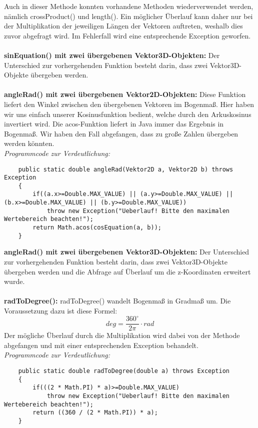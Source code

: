 \documentclass[a4paper,11pt]{scrartcl}
\begin{document}
Auch in dieser Methode konnten vorhandene Methoden wiederverwendet werden, nämlich crossProduct() und length(). Ein möglicher Überlauf kann daher nur bei der Multiplikation der jeweiligen Längen der Vektoren auftreten, weshalb dies zuvor abgefragt wird. Im Fehlerfall wird eine entsprechende Exception geworfen.\\
\\
\textbf{sinEquation() mit zwei übergebenen Vektor3D-Objekten:} Der Unterschied zur vorhergehenden Funktion besteht darin, dass zwei Vektor3D-Objekte übergeben werden.\\
\\
\textbf{angleRad() mit zwei übergebenen Vektor2D-Objekten:} Diese Funktion liefert den Winkel zwischen den übergebenen Vektoren im Bogenmaß. Hier haben wir uns einfach unserer Kosinusfunktion bedient, welche durch den Arkuskosinus invertiert wird. Die acos-Funktion liefert in Java immer das Ergebnis in Bogenmaß.
Wir haben den Fall abgefangen, dass zu große Zahlen übergeben werden könnten.\\
\textit{Programmcode zur Verdeutlichung:}
\begin{lstlisting}
	public static double angleRad(Vektor2D a, Vektor2D b) throws Exception
	{
		if((a.x>=Double.MAX_VALUE) || (a.y>=Double.MAX_VALUE) || (b.x>=Double.MAX_VALUE) || (b.y>=Double.MAX_VALUE))
			throw new Exception("Ueberlauf! Bitte den maximalen Wertebereich beachten!");
		return Math.acos(cosEquation(a, b));
	}
\end{lstlisting} $\;$ \\
\textbf{angleRad() mit zwei übergebenen Vektor3D-Objekten:} Der Unterschied zur vorhergehenden Funktion besteht darin, dass zwei Vektor3D-Objekte übergeben werden und die Abfrage auf Überlauf um die z-Koordinaten erweitert wurde.\\
\\
\textbf{radToDegree():} radToDegree() wandelt Bogenmaß in Gradmaß um. Die Voraussetzung dazu ist diese Formel:
\[ deg = \frac{360 ^\circ }{2\pi} \cdot rad \]
Der mögliche Überlauf durch die Multiplikation wird dabei von der Methode abgefangen und mit einer entsprechenden Exception behandelt.\\
\textit{Programmcode zur Verdeutlichung:}
\begin{lstlisting}
	public static double radToDegree(double a) throws Exception
	{
		if(((2 * Math.PI) * a)>=Double.MAX_VALUE)
			throw new Exception("Ueberlauf! Bitte den maximalen Wertebereich beachten!");
		return ((360 / (2 * Math.PI)) * a);
	}
\end{lstlisting} $\;$ \\
\end{document}
